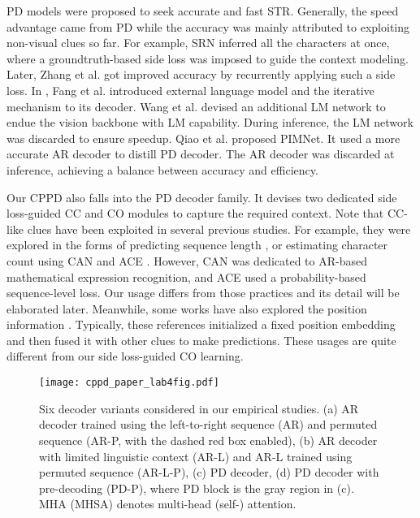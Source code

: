 \documentclass[10pt,journal,compsoc]{IEEEtran}
\begin{document}
PD models were proposed to seek accurate and fast STR. Generally, the speed advantage came from PD while the accuracy was mainly attributed to exploiting non-visual clues so far. For example, SRN \cite{yu2020srn} inferred all the characters at once, where a groundtruth-based side loss was imposed to guide the context modeling. Later, Zhang et al. \cite{zhang2023linguistic} got improved accuracy by recurrently applying such a side loss. In \cite{fang2021abinet}, Fang et al. introduced external language model and the iterative mechanism to its decoder. Wang et al. \cite{Wang_2021_visionlan} devised an additional LM network to endue the vision backbone with LM capability. During inference, the LM network was discarded to ensure speedup. Qiao et al. \cite{qiao2021pimnet} proposed PIMNet. It used a more accurate AR decoder to distill PD decoder. The AR decoder was discarded at inference, achieving a balance between accuracy and efficiency.


Our CPPD also falls into the PD decoder family. It devises two dedicated side loss-guided CC and CO modules to capture the required context. Note that CC-like clues have been exploited in several previous studies. For example, they were explored in the forms of predicting sequence length \cite{jiang2021reciprocal}, or estimating character count using CAN \cite{li2022counting} and ACE \cite{xie2019aggregation}. However, CAN was dedicated to AR-based mathematical expression recognition, and ACE used a probability-based sequence-level loss. Our usage differs from those practices and its detail will be elaborated later. Meanwhile, some works have also explored the position information \cite{yue2020robustscanner,wang2020decoupled,zheng2023cdistnet,yu2020srn,fang2021abinet,Wang_2021_visionlan}. Typically, these references initialized a fixed position embedding and then fused it with other clues to make predictions. These usages are quite different from our side loss-guided CO learning.


\begin{figure}[t] 
\centering
\texttt{[image: cppd\_paper\_lab4fig.pdf]}  
\caption{Six decoder variants considered in our empirical studies. (a) AR decoder trained using the left-to-right sequence (AR) and permuted sequence (AR-P, with the dashed red box enabled), (b) AR decoder with limited linguistic context (AR-L) and AR-L trained using permuted sequence (AR-L-P), (c) PD decoder, (d) PD decoder with pre-decoding (PD-P), where PD block is the gray region in (c). MHA (MHSA) denotes multi-head (self-) attention.}  
\label{fig:exp_4}  
\end{figure}
\end{document}

